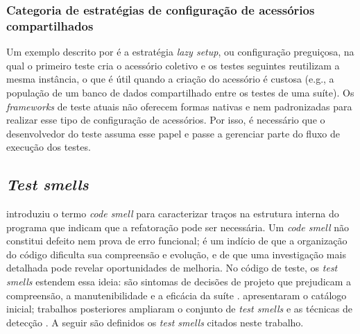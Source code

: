 \subsubsection{Categoria de estratégias de configuração de acessórios compartilhados}

Um exemplo descrito por  é a estratégia \textit{lazy setup}, ou configuração preguiçosa, na qual o primeiro teste cria o acessório coletivo e os testes seguintes reutilizam a mesma instância, o que é útil quando a criação do acessório é custosa (e.g., a população de um banco de dados compartilhado entre os testes de uma suíte). Os \textit{frameworks} de teste atuais não oferecem formas nativas e nem padronizadas para realizar esse tipo de configuração de acessórios. Por isso, é necessário que o desenvolvedor do teste assuma esse papel e passe a gerenciar parte do fluxo de execução dos testes.

\subsection{\textit{Test smells}}
\label{section:test-smells}

 introduziu o termo \textit{code smell} para caracterizar traços na estrutura interna do programa que indicam que a refatoração pode ser necessária. Um \textit{code smell} não constitui defeito nem prova de erro funcional; é um indício de que a organização do código dificulta sua compreensão e evolução, e de que uma investigação mais detalhada pode revelar oportunidades de melhoria. No código de teste, os \textit{test smells} estendem essa ideia: são sintomas de decisões de projeto que prejudicam a compreensão, a manutenibilidade e a eficácia da suíte \cite{vandeursen:etal:2001}.  apresentaram o catálogo inicial; trabalhos posteriores ampliaram o conjunto de \textit{test smells} e as técnicas de detecção \cite{greiler:etal:2013:a,peruma:etal:2020}. A seguir são definidos os \textit{test smells} citados neste trabalho.

